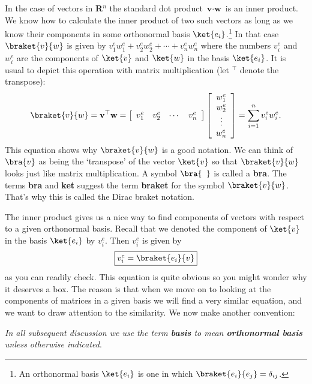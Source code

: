In the case of vectors in \textbf{R}$^n$ the standard dot product $\textbf{v}\cdot \textbf{w}$ is an inner product.  We know how to calculate the inner product of two such vectors as long as we know their components in some orthonormal basis $\ket{e_i}$.\footnote{An orthonormal basis $\ket{e_i}$ is one in which $\braket{e_i}{e_j} = \delta _{ij}$.}  In that case $\braket{v}{w}$ is given by $v^{e}_1 w^{e}_1 + v^{e}_2 w^{e}_2 + \cdots + v^{e}_n w^{e}_n$ where the numbers $v^{e}_i$ and $w^{e}_i$ are the components of $\ket{v}$ and $\ket{w}$ in the basis $\ket{e_i}$.  It is usual to depict this operation with matrix multiplication (let $^\top$ denote the transpose):
\begin{displaymath}
\braket{v}{w}
= \textbf{v}^\top \textbf{w}
= \left[ \begin{array}{cccc}
v^{e}_{1} & v^{e}_{2} & \cdots & v^{e}_{n} \end{array} \right]
\left[ \begin{array}{c}
w^{e}_1 \\ w^{e}_2 \\ \vdots \\ w^{e}_n \end{array} \right] 
= \sum_{i=1}^{n} v_i^ew_i^e.
\end{displaymath}
This equation shows why $\braket{v}{w}$ is a good notation.  We can think of $\bra{v}$ as being the `transpose' of the vector $\ket{v}$ so that $\braket{v}{w}$ looks just like matrix multiplication.  A symbol $\bra{\phantom{v}}$ is called a \textbf{bra}.  The terms \textbf{bra} and \textbf{ket} suggest the term \textbf{braket} for the symbol $\braket{v}{w}$.  That's why this is called the Dirac braket notation.

The inner product gives us a nice way to find components of vectors with respect to a given orthonormal basis.
Recall that we denoted the component of $\ket{v}$ in the basis $\ket{e_i}$ by $v^{e}_{i}$.  Then $v^{e}_{i}$ is given by
\begin{equation} \label{eq:vectorcomp}
\framebox{$v^{e}_i = \braket{e_i}{v}$}
\end{equation}
as you can readily check.  This equation is quite obvious so you might wonder why it deserves a box.  The reason is that when we move on to looking at the components of matrices in a given basis we will find a very similar equation, and we want to draw attention to the similarity.  We now make another convention:

\textit{In all subsequent discussion we use the term \emph{\textbf{basis}} to mean \emph{\textbf{orthonormal basis}} unless otherwise indicated}.

